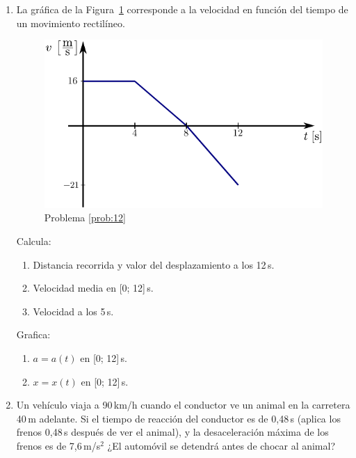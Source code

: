 \begin{enumerate}
\item \label{prob:12} La gráfica de la Figura~\ref{fig:prob12} corresponde a la velocidad en función del tiempo de un movimiento rectilíneo.
  
  \begin{figure}[!htb]
    \centering
    \includegraphics[scale=0.8]{img/prob12.pdf}
    \caption{\label{fig:prob12} Problema \ref{prob:12}}
  \end{figure}
  
  Calcula:
  \begin{enumerate}
    \item Distancia recorrida y valor del desplazamiento a los 12\,s.
    \item Velocidad media en [0; 12]\,s.
    \item Velocidad a los 5\,s.
  \end{enumerate}
  Grafica:
  \begin{enumerate}
    \item $a =  a(t)$ en [0; 12]\,s.
    \item $x =  x(t)$ en [0; 12]\,s.
  \end{enumerate}


  \item Un vehículo viaja a 90\,km/h cuando el conductor ve un animal en la carretera 40\,m adelante. Si el tiempo de reacción del conductor es de 0,48\,s (aplica los frenos 0,48\,s después de ver el animal), y la desaceleración máxima de los frenos es de 7,6\,m/s$^2$ ¿El automóvil se detendrá antes de chocar al animal?
  

\end{enumerate}
